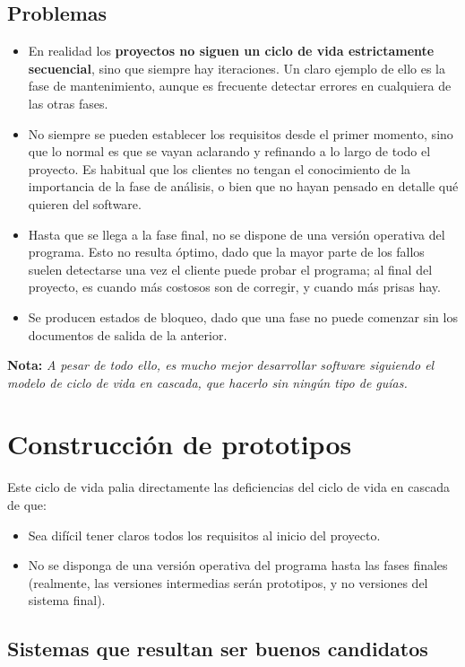\subsection{Problemas}
\begin{itemize}
   \item En realidad los \textbf{proyectos no siguen un ciclo de vida estrictamente secuencial}, sino que siempre hay iteraciones. Un claro ejemplo de ello es la fase de mantenimiento, aunque es frecuente detectar errores en cualquiera de las otras fases. 
   \item No siempre se pueden establecer los requisitos desde el primer momento, sino que lo normal es que se vayan aclarando y refinando a lo largo de todo el proyecto. Es habitual que los clientes no tengan el conocimiento de la importancia de la fase de análisis, o bien que no hayan pensado en detalle qué quieren del software.
   \item Hasta que se llega a la fase final, no se dispone de una versión operativa del programa. Esto no resulta óptimo, dado que la mayor parte de los fallos suelen detectarse una vez el cliente puede probar el programa; al final del proyecto, es cuando más costosos son de corregir, y cuando más prisas hay.
   \item Se producen estados de bloqueo, dado que una fase no puede comenzar sin los documentos de salida de la anterior.
\end{itemize}

\textbf{Nota:} \textit{A pesar de todo ello, es mucho mejor desarrollar software siguiendo el modelo de ciclo de vida en cascada, que hacerlo sin ningún tipo de guías.}


\section{Construcción de prototipos}

Este ciclo de vida palia directamente las deficiencias del ciclo de vida en cascada de que:

\begin{itemize}
   \item Sea difícil tener claros todos los requisitos al inicio del proyecto.
   \item No se disponga de una versión operativa del programa hasta las fases finales (realmente, las versiones intermedias serán prototipos, y no versiones del sistema final).
\end{itemize}

\subsection{Sistemas que resultan ser buenos candidatos}

